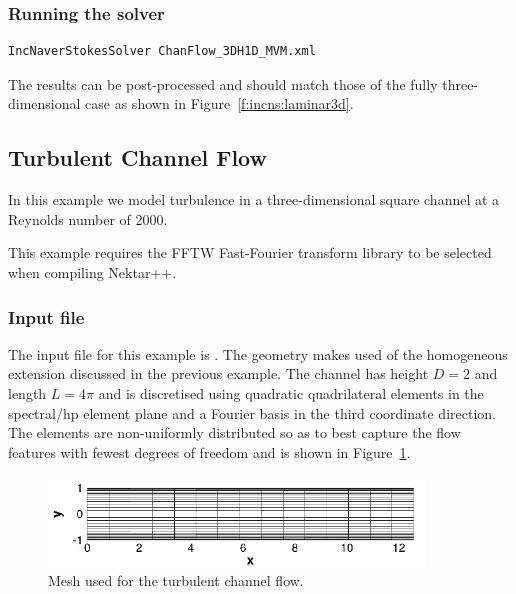 \subsubsection{Running the solver}
\begin{lstlisting}[style=BashInputStyle]
IncNaverStokesSolver ChanFlow_3DH1D_MVM.xml
\end{lstlisting}
The results can be post-processed and should match those of the fully
three-dimensional case as shown in Figure~\ref{f:incns:laminar3d}.



\subsection{Turbulent Channel Flow}
In this example we model turbulence in a three-dimensional square channel at a
Reynolds number of 2000.

\begin{notebox}
This example requires the FFTW Fast-Fourier transform library to be selected
when compiling Nektar++.
\end{notebox}

\subsubsection{Input file}
The input file for this example is . The geometry
makes used of the homogeneous extension discussed in the previous example. The
channel has height $D=2$ and length $L=4\pi$ and is discretised using quadratic
quadrilateral elements in the spectral/hp element plane and a Fourier basis in
the third coordinate direction. The elements are non-uniformly distributed so as
to best capture the flow features with fewest degrees of freedom and is shown in
Figure~\ref{f:incns:turbchanmesh}.

\begin{figure}
\begin{center}
\includegraphics[width=10cm]{Figures/ChanMesh.png}
\caption{Mesh used for the turbulent channel flow.}
\label{f:incns:turbchanmesh}
\end{center}
\end{figure}

